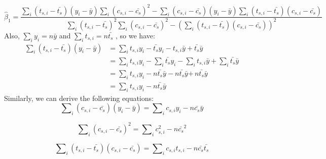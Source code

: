 \begin{appendices}
\begin{equation}\label{eq2}
\hat{\beta }_{1}=\frac{\sum\nolimits_i {\left( t_{s,i}-\bar{t_{s}}\right)\left( y_{i}-\bar{y} \right)\sum\nolimits_i \left(c_{s,i}-\bar{c_{s}} \right)^{2} -} \sum\nolimits_i {\left(c_{s,i}-\bar{c_{s}} \right)\left( y_{i}-\bar{y} \right)\sum\nolimits_i{\left( t_{s,i}-\bar{t_{s}} \right)\left( c_{s,i}-\bar{c_{s}} \right)} }}{\sum\nolimits_i {\left( t_{s,i}-\bar{t_{s}} \right)^{2}\sum\nolimits_i\left( c_{s,i}-\bar{c_{s}} \right)^{2} -} \left( \sum\nolimits_i {\left(t_{s,i}-\bar{t_{s}} \right)\left( c_{s,i}-\bar{c_{s}} \right)} \right)^{2}}
\end{equation}
Also, $\sum\nolimits_i {y_{i}=} n\bar{y}$ and $\sum\nolimits_i {t_{s,i}=}n\bar{t_{s}}$ , so we have:
\begin{equation}\label{eq3}
\begin{aligned}
\sum\nolimits_i {\left( t_{s,i}-\bar{t_{s}} \right)\left( y_{i}-\bar{y} \right)} &=\sum\nolimits_i {t_{s,i}y_{i}-\bar{t_{s}}y_{i}-t_{s,i}\bar{y}+\bar{t_{s}}\bar{y}}\\
 &=\sum\nolimits_i {t_{s,i}y_{i}} -\sum\nolimits_i {\bar{t_{s}}y_{i}} -\sum\nolimits_i {t_{s,i}\bar{y}} +\sum\nolimits_i {\bar{t_{s}}\bar{y}}\\
  &=\sum\nolimits_i {t_{s,i}y_{i}} -n\bar{t_{s}}\bar{y}-n\bar{t_{s}}\bar{y}\mathrm{+}\, n\bar{t_{s}}\bar{y}\\
  &=\sum\nolimits_i {t_{s,i}y_{i}} -n\bar{t_{s}}\bar{y}
  \end{aligned}
\end{equation}
Similarly, we can derive the following equations:
\begin{equation}\label{eq4}
\sum\nolimits_i {\left( c_{s,i}-\bar{c_{s}} \right)\left( y_{i}-\bar{y} \right)} =\sum\nolimits_i {c_{s,i}y_{i}} -n\bar{c_{s}}\bar{y}
\end{equation}

\begin{equation}\label{eq5}
\sum\nolimits_i \left( c_{s,i}-\bar{c_{s}} \right)^{2} =\sum\nolimits_i c_{s,i}^{2} -n\bar{c_{s}}^{2}
\end{equation}

\begin{equation}\label{eq6}
\sum\nolimits_i {\left( t_{s,i}-\bar{t_{s}} \right)\left( c_{s,i}-\bar{c_{s}} \right)} =\sum\nolimits_i {c_{s,i}t_{s,i}} -n\bar{c_{s}}\bar{t_{s}}
\end{equation}


\end{appendices}
